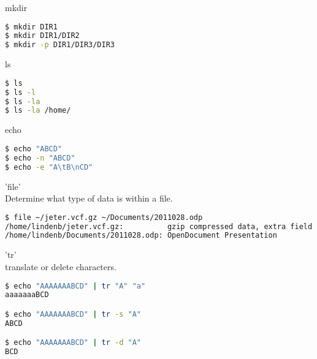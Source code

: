 \documentclass{beamer}
\begin{document}
\begin{frame}[fragile]
 \begin{center}
    \huge{mkdir}\\
    \end{center}
\begin{lstlisting}[language=bash]
$ mkdir DIR1
$ mkdir DIR1/DIR2
$ mkdir -p DIR1/DIR3/DIR3
\end{lstlisting}
\end{frame}

\begin{frame}[fragile]
 \begin{center}
    \huge{ls}\\
    \end{center}
\begin{lstlisting}[language=bash]
$ ls
$ ls -l
$ ls -la
$ ls -la /home/
\end{lstlisting}
\end{frame}


\begin{frame}[fragile]
 \begin{center}
    \huge{echo}\\
    \end{center}
\begin{lstlisting}[language=bash]
$ echo "ABCD"
$ echo -n "ABCD"
$ echo -e "A\tB\nCD"
\end{lstlisting}
\end{frame}

\begin{frame}[fragile]
 \begin{center}
    \huge{'file'}\\
     	Determine what type of data is within a file.\\
    \end{center}
\begin{lstlisting}[language=bash]
$ file ~/jeter.vcf.gz ~/Documents/2011028.odp
/home/lindenb/jeter.vcf.gz:          gzip compressed data, extra field
/home/lindenb/Documents/2011028.odp: OpenDocument Presentation
\end{lstlisting}
\end{frame}


\begin{frame}[fragile]
 \begin{center}
    \huge{'tr'}\\
     	translate or delete characters.\\
    \end{center}
\begin{lstlisting}[language=bash]
$ echo "AAAAAAABCD" | tr "A" "a"
aaaaaaaBCD

$ echo "AAAAAAABCD" | tr -s "A" 
ABCD

$ echo "AAAAAAABCD" | tr -d "A" 
BCD
\end{lstlisting}
\end{frame}
\end{document}
